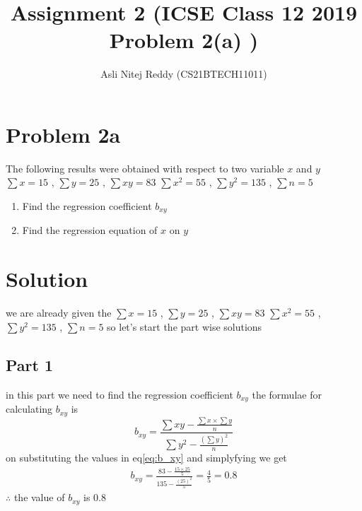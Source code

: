 \documentclass[12pt,twocolumn]{article}
\title{Assignment 2 (ICSE Class 12 2019 Problem 2(a) )}
\author{Asli Nitej Reddy (CS21BTECH11011)}
\begin{document}
\vspace{3cm}
\maketitle

\section*{Problem 2a}
The following results were obtained with respect to two variable $x$ and $y$
\newline
$\sum x = 15$ , $\sum y = 25$ , $\sum xy = 83$
\newline
$\sum x^{2} = 55$ , $\sum y^{2} = 135$ , $\sum n = 5$
\begin{enumerate}
    \item Find the regression coefficient $b_{xy}$
    \item Find the regression equation of $x$ on $y$
\end{enumerate}

\section*{Solution}
we are already given the 
\newline
$\sum x = 15$ , $\sum y = 25$ , $\sum xy = 83$
\newline
$\sum x^{2} = 55$ , $\sum y^{2} = 135$ , $\sum n = 5$
\newline
so let's start the part wise solutions
\subsection*{Part 1}
in this part we need to find the regression coefficient $b_{xy}$
\newline
the formulae for calculating $b_{xy}$ is
\begin{equation}
\label{eq:b_xy}
b_{xy}=\frac{\sum xy-\frac{{\sum x}\times  {\sum y}}{n} }{\sum y^{2}-\frac{(\sum y)^{2}}{n} }
\end{equation}
on substituting the values in eq\eqref{eq:b_xy} and simplyfying  we get 
\begin{align}
b_{xy}=\frac{83-\frac{15\times25}{5}}{135-\frac{(25)^{2}}{5} } = \frac{4}{5} = 0.8
\end{align}
$\therefore$ the value of $b_{xy}$ is 0.8
 
\end{document}
